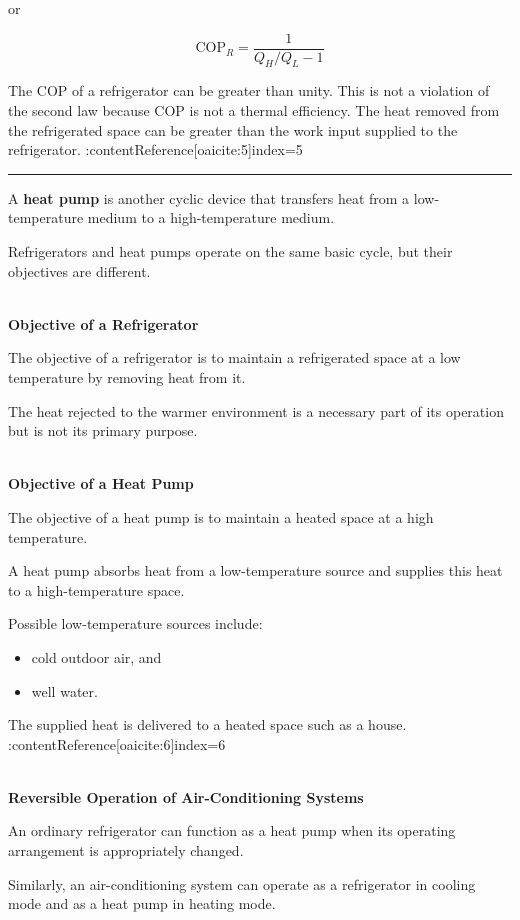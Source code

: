 \documentclass[12pt]{article}
\newcommand{\mysubsection}[2]{%
    \vspace{5px}
    \noindent{\headingfont\large #1\space #2\par}
    \vspace{4pt}
    \hrule
    \vspace{15pt}
}
\begin{document}
or

\begin{equation*}
\mathrm{COP}_R =
\frac{1}{Q_H/Q_L-1}
\end{equation*}

The COP of a refrigerator can be greater than unity. This is not a violation of the second law because COP is not a thermal efficiency. The heat removed from the refrigerated space can be greater than the work input supplied to the refrigerator. :contentReference[oaicite:5]{index=5}

\mysubsection{}{Heat Pumps}

A \textbf{heat pump} is another cyclic device that transfers heat from a low-temperature medium to a high-temperature medium.

Refrigerators and heat pumps operate on the same basic cycle, but their objectives are different.

\textbf{\\ Objective of a Refrigerator}

The objective of a refrigerator is to maintain a refrigerated space at a low temperature by removing heat from it.

The heat rejected to the warmer environment is a necessary part of its operation but is not its primary purpose.

\textbf{\\ Objective of a Heat Pump}

The objective of a heat pump is to maintain a heated space at a high temperature.

A heat pump absorbs heat from a low-temperature source and supplies this heat to a high-temperature space.

Possible low-temperature sources include:

\begin{itemize}
    \item cold outdoor air, and
    \item well water.
\end{itemize}

The supplied heat is delivered to a heated space such as a house. :contentReference[oaicite:6]{index=6}

\textbf{\\ Reversible Operation of Air-Conditioning Systems}

An ordinary refrigerator can function as a heat pump when its operating arrangement is appropriately changed.

Similarly, an air-conditioning system can operate as a refrigerator in cooling mode and as a heat pump in heating mode.
\end{document}
